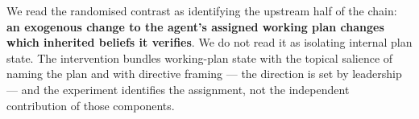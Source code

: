 We read the randomised contrast as identifying the upstream half of the chain:
\textbf{an exogenous change to the agent's assigned working plan changes which
inherited beliefs it verifies}. We do not read it as isolating internal plan
state. The intervention bundles working-plan state with the topical salience of
naming the plan and with directive framing --- the direction is set by
leadership --- and the experiment identifies the assignment, not the
independent contribution of those components.
